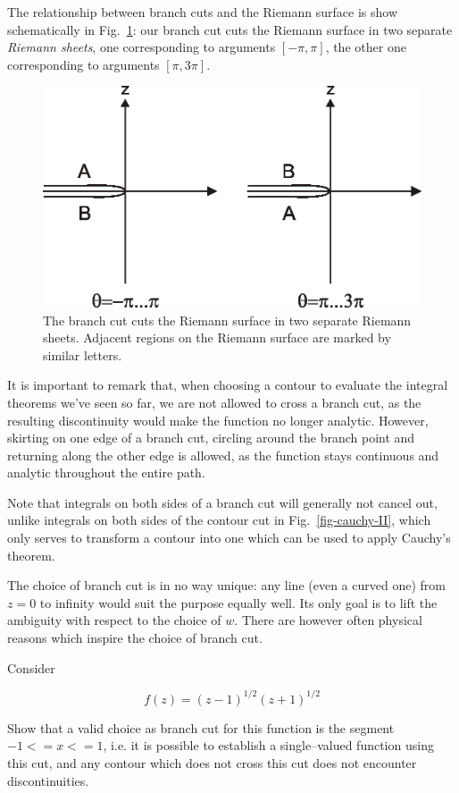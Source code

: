 The relationship between branch cuts and the Riemann surface is show
schematically in Fig.~\ref{fig-sheets}: our branch cut cuts the Riemann surface
in two separate \emph{Riemann sheets}, one corresponding to arguments $[-\pi,
\pi]$, the other one corresponding to arguments $[\pi,3 \pi]$.
\begin{figure}
\centering
\includegraphics{complex/figures/sheets}
\caption{The branch cut cuts the Riemann surface in two separate Riemann sheets.
Adjacent regions on the Riemann surface are marked by similar letters.}
\label{fig-sheets}
\end{figure}

It is important to remark that, when choosing a contour to evaluate the integral
theorems we've seen so far, we are not allowed to cross a branch cut, as the
resulting discontinuity would make the function no longer analytic. However,
skirting on one edge of a branch cut, circling around the branch point and
returning along the other edge is allowed, as the function stays continuous and
analytic throughout the entire path. 

Note that integrals on both sides of a branch cut will generally not cancel out,
unlike integrals on both sides of the contour cut in Fig.~\ref{fig-cauchy-II},
which only serves to transform a contour into one which can be used to apply
Cauchy's theorem.

The choice of branch cut is in no way unique: any line (even a curved one) from
$z=0$ to infinity would suit the purpose equally well. Its only goal is to lift
the ambiguity with respect to the choice of $w$. There are however often
physical reasons which inspire the choice of branch cut.

\begin{sidebar}
\begin{ex}
Consider

$$f(z)=(z-1)^{1/2}(z+1)^{1/2}$$

Show that a valid choice as branch cut for this function is the segment $-1<= x <= 1$, i.e. it is possible to establish a single--valued function using this cut, and any contour which does not cross this cut does not encounter discontinuities.
\end{ex}
\end{sidebar}

